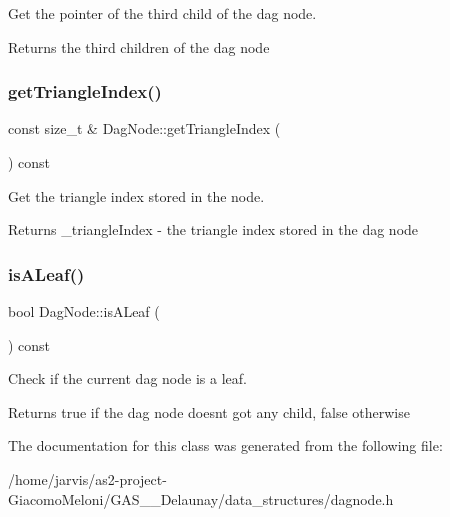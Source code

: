 Get the pointer of the third child of the dag node. 

\begin{DoxyReturn}{Returns}
the third children of the dag node 
\end{DoxyReturn}
\mbox{\label{classDagNode_a5ff9ecbb6e1a5008c5b833afc8f08bab}} 
\subsubsection{\texorpdfstring{get\+Triangle\+Index()}{getTriangleIndex()}}
{\footnotesize\ttfamily const size\+\_\+t \& Dag\+Node\+::get\+Triangle\+Index (\begin{DoxyParamCaption}{ }\end{DoxyParamCaption}) const\hspace{0.3cm}{\ttfamily [inline]}}



Get the triangle index stored in the node. 

\begin{DoxyReturn}{Returns}
\+\_\+triangle\+Index -\/ the triangle index stored in the dag node 
\end{DoxyReturn}
\mbox{\label{classDagNode_af3ed3a5eed4cb9bf04ec6ad9b6877cce}} 
\subsubsection{\texorpdfstring{is\+A\+Leaf()}{isALeaf()}}
{\footnotesize\ttfamily bool Dag\+Node\+::is\+A\+Leaf (\begin{DoxyParamCaption}{ }\end{DoxyParamCaption}) const\hspace{0.3cm}{\ttfamily [inline]}}



Check if the current dag node is a leaf. 

\begin{DoxyReturn}{Returns}
true if the dag node doesn\textquotesingle{}t got any child, false otherwise 
\end{DoxyReturn}


The documentation for this class was generated from the following file\+:\begin{DoxyCompactItemize}
\item 
/home/jarvis/as2-\/project-\/\+Giacomo\+Meloni/\+G\+A\+S\+\_\+\_\+\+Delaunay/data\+\_\+structures/dagnode.\+h\end{DoxyCompactItemize}
